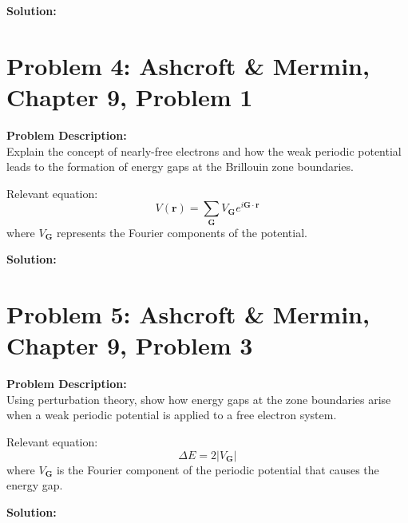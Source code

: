 \documentclass[12pt]{article}
\begin{document}
\vspace{2em}
\noindent \textbf{Solution:} \\
\vspace{10em}

\section*{Problem 4: Ashcroft \& Mermin, Chapter 9, Problem 1}
\noindent \textbf{Problem Description:} \\
Explain the concept of nearly-free electrons and how the weak periodic potential leads to the formation of energy gaps at the Brillouin zone boundaries.

Relevant equation:
\begin{equation}
V(\mathbf{r}) = \sum_{\mathbf{G}} V_{\mathbf{G}} e^{i \mathbf{G} \cdot \mathbf{r}}
\end{equation}
where \( V_{\mathbf{G}} \) represents the Fourier components of the potential.

\vspace{2em}
\noindent \textbf{Solution:} \\
\vspace{10em}

\section*{Problem 5: Ashcroft \& Mermin, Chapter 9, Problem 3}
\noindent \textbf{Problem Description:} \\
Using perturbation theory, show how energy gaps at the zone boundaries arise when a weak periodic potential is applied to a free electron system.

Relevant equation:
\begin{equation}
\Delta E = 2 | V_{\mathbf{G}} |
\end{equation}
where \( V_{\mathbf{G}} \) is the Fourier component of the periodic potential that causes the energy gap.

\vspace{2em}
\noindent \textbf{Solution:} \\
\vspace{10em}
\end{document}
